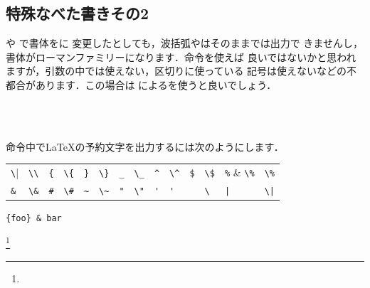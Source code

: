 {\subsection{特殊なべた書きその2\zdash{}}
 や  で書体をに
変更したとしても，波括弧やはそのままでは出力で
きませんし，書体がローマンファミリーになります．命令を使えば
良いではないかと思われますが，引数の中では使えない，区切りに使っている
記号は使えないなどの不都合があります．この場合は
によるを使うと良いでしょう．
\begin{Syntax}
\\
　\\
\end{Syntax}
命令中で{\LaTeX}の予約文字を出力するには次のようにします．
\begin{scenter}
 \begin{tabular}{LCCCCCC}
 \verb|\| & \verb|\\| & \verb|{| & \verb|\{| & \verb|}| & \verb|\}| & 
 \verb|_| & \verb|\_| & \verb|^| & \verb|\^| & \verb|$| & \verb|\$| &
 \verb|%| & \verb|\%| \\
 \verb|&| & \verb|\&| & \verb|#| & \verb|\#| & \verb|~| & \verb|\~| &
 \verb|"| & \verb|\"| & \verb|'| & \verb|'|  & \verb*| | & \verb*|\ | &
 \verb+|+ & \verb+\|+ \\%
 \end{tabular}
\end{scenter} 
%
\begin{InOut}
\begin{minipage}{.9\linewidth}
\texttt{\{foo\} \& bar}\par
{}%
\footnote{}
\end{minipage}
\end{InOut}


}
